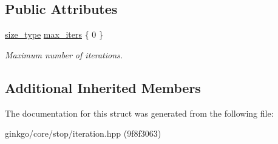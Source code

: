 \subsection*{Public Attributes}
\begin{DoxyCompactItemize}
\item 
\mbox{\label{structgko_1_1stop_1_1Iteration_1_1parameters__type_a7daf7ecb5cf107b9e7444b0898f691c4}} 
\hyperlink{namespacegko_a6e5c95df0ae4e47aab2f604a22d98ee7}{size\+\_\+type} \hyperlink{structgko_1_1stop_1_1Iteration_1_1parameters__type_a7daf7ecb5cf107b9e7444b0898f691c4}{max\+\_\+iters} \{ 0 \}
\begin{DoxyCompactList}\small\item\em Maximum number of iterations. \end{DoxyCompactList}\end{DoxyCompactItemize}
\subsection*{Additional Inherited Members}


The documentation for this struct was generated from the following file\+:\begin{DoxyCompactItemize}
\item 
ginkgo/core/stop/iteration.\+hpp (9f8f3063)\end{DoxyCompactItemize}
